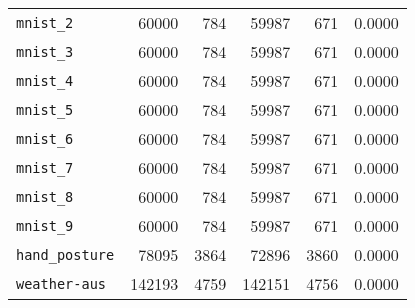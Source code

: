 \begin{tabular}{lrrrrr}
\texttt{mnist\_2}& 60000& 784& 59987& 671& 0.0000\\
\texttt{mnist\_3}& 60000& 784& 59987& 671& 0.0000\\
\texttt{mnist\_4}& 60000& 784& 59987& 671& 0.0000\\
\texttt{mnist\_5}& 60000& 784& 59987& 671& 0.0000\\
\texttt{mnist\_6}& 60000& 784& 59987& 671& 0.0000\\
\texttt{mnist\_7}& 60000& 784& 59987& 671& 0.0000\\
\texttt{mnist\_8}& 60000& 784& 59987& 671& 0.0000\\
\texttt{mnist\_9}& 60000& 784& 59987& 671& 0.0000\\
\texttt{hand\_posture}& 78095& 3864& 72896& 3860& 0.0000\\
\texttt{weather-aus}& 142193& 4759& 142151& 4756& 0.0000\\
\bottomrule
\end{tabular}
